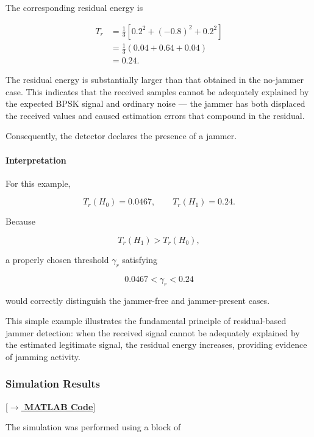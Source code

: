 \documentclass{article}
\begin{document}
The corresponding residual energy is

\begin{align}
T_r
&=
\frac{1}{3}
\left[
0.2^2+(-0.8)^2+0.2^2
\right] \\
&=
\frac{1}{3}
\left(
0.04+0.64+0.04
\right) \\
&=
0.24.
\end{align}

The residual energy is substantially larger than that obtained in the no-jammer case. This indicates that the received samples cannot be adequately explained by the expected BPSK signal and ordinary noise — the jammer has both displaced the received values and caused estimation errors that compound in the residual.

Consequently, the detector declares the presence of a jammer.

\paragraph{Interpretation}

For this example,

\begin{equation}
T_r(H_0)=0.0467,
\qquad
T_r(H_1)=0.24.
\end{equation}

Because

\begin{equation}
T_r(H_1) > T_r(H_0),
\end{equation}

a properly chosen threshold $\gamma_r$ satisfying

\begin{equation}
0.0467 < \gamma_r < 0.24
\end{equation}

would correctly distinguish the jammer-free and jammer-present cases.

This simple example illustrates the fundamental principle of residual-based jammer detection: when the received signal cannot be adequately explained by the estimated legitimate signal, the residual energy increases, providing evidence of jamming activity.

\subsubsection{Simulation Results} [\hyperref[lst:residual]{\textbf{$\rightarrow$ MATLAB Code}}]

The simulation was performed using a block of
\end{document}

